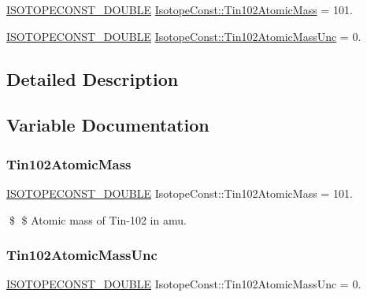 \begin{DoxyCompactItemize}
\item 
\mbox{\hyperlink{group___isotope_const-_macros_ga8f45a7272ce02c0b4c65c44636ed719a}{I\+S\+O\+T\+O\+P\+E\+C\+O\+N\+S\+T\+\_\+\+D\+O\+U\+B\+LE}} \mbox{\hyperlink{group___isotope_const-_tin-_sn102_ga89575d9b7c69bfde61755dbdb18c1cc0}{Isotope\+Const\+::\+Tin102\+Atomic\+Mass}} = 101.
\item 
\mbox{\hyperlink{group___isotope_const-_macros_ga8f45a7272ce02c0b4c65c44636ed719a}{I\+S\+O\+T\+O\+P\+E\+C\+O\+N\+S\+T\+\_\+\+D\+O\+U\+B\+LE}} \mbox{\hyperlink{group___isotope_const-_tin-_sn102_ga2a0fe0c141c5ab58d6a7c53eb62f05c7}{Isotope\+Const\+::\+Tin102\+Atomic\+Mass\+Unc}} = 0.
\end{DoxyCompactItemize}


\subsection{Detailed Description}


\subsection{Variable Documentation}
\mbox{\label{group___isotope_const-_tin-_sn102_ga89575d9b7c69bfde61755dbdb18c1cc0}} 
\subsubsection{\texorpdfstring{Tin102\+Atomic\+Mass}{Tin102AtomicMass}}
{\footnotesize\ttfamily \mbox{\hyperlink{group___isotope_const-_macros_ga8f45a7272ce02c0b4c65c44636ed719a}{I\+S\+O\+T\+O\+P\+E\+C\+O\+N\+S\+T\+\_\+\+D\+O\+U\+B\+LE}} Isotope\+Const\+::\+Tin102\+Atomic\+Mass = 101.}

\$ \$ Atomic mass of Tin-\/102 in amu. \mbox{\label{group___isotope_const-_tin-_sn102_ga2a0fe0c141c5ab58d6a7c53eb62f05c7}} 
\subsubsection{\texorpdfstring{Tin102\+Atomic\+Mass\+Unc}{Tin102AtomicMassUnc}}
{\footnotesize\ttfamily \mbox{\hyperlink{group___isotope_const-_macros_ga8f45a7272ce02c0b4c65c44636ed719a}{I\+S\+O\+T\+O\+P\+E\+C\+O\+N\+S\+T\+\_\+\+D\+O\+U\+B\+LE}} Isotope\+Const\+::\+Tin102\+Atomic\+Mass\+Unc = 0.}

